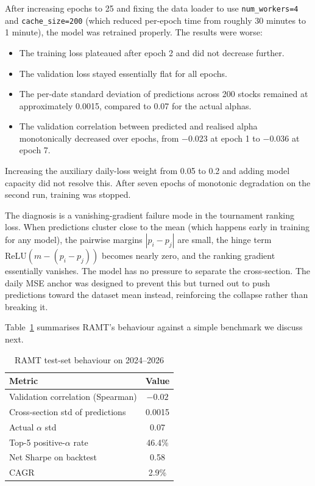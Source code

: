 \documentclass[conference]{IEEEtran}
\begin{document}
After increasing epochs to 25 and fixing the data loader to use \texttt{num\_workers=4} and \texttt{cache\_size=200} (which reduced per-epoch time from roughly 30 minutes to 1 minute), the model was retrained properly. The results were worse:

\begin{itemize}
    \item The training loss plateaued after epoch 2 and did not decrease further.
    \item The validation loss stayed essentially flat for all epochs.
    \item The per-date standard deviation of predictions across 200 stocks remained at approximately 0.0015, compared to 0.07 for the actual alphas.
    \item The validation correlation between predicted and realised alpha monotonically decreased over epochs, from $-0.023$ at epoch 1 to $-0.036$ at epoch 7.
\end{itemize}

Increasing the auxiliary daily-loss weight from 0.05 to 0.2 and adding model capacity did not resolve this. After seven epochs of monotonic degradation on the second run, training was stopped.

The diagnosis is a vanishing-gradient failure mode in the tournament ranking loss. When predictions cluster close to the mean (which happens early in training for any model), the pairwise margins $|p_i - p_j|$ are small, the hinge term $\text{ReLU}(m - (p_i - p_j))$ becomes nearly zero, and the ranking gradient essentially vanishes. The model has no pressure to separate the cross-section. The daily MSE anchor was designed to prevent this but turned out to push predictions toward the dataset mean instead, reinforcing the collapse rather than breaking it.

Table~\ref{tab:ramt-results} summarises RAMT's behaviour against a simple benchmark we discuss next.

\begin{table}[htbp]
\caption{RAMT test-set behaviour on 2024--2026}
\label{tab:ramt-results}
\centering
\begin{tabular}{lc}
\toprule
\textbf{Metric} & \textbf{Value} \\
\midrule
Validation correlation (Spearman) & $-0.02$ \\
Cross-section std of predictions & 0.0015 \\
Actual $\alpha$ std & 0.07 \\
Top-5 positive-$\alpha$ rate & 46.4\% \\
Net Sharpe on backtest & 0.58 \\
CAGR & 2.9\% \\
\bottomrule
\end{tabular}
\end{table}
\end{document}
